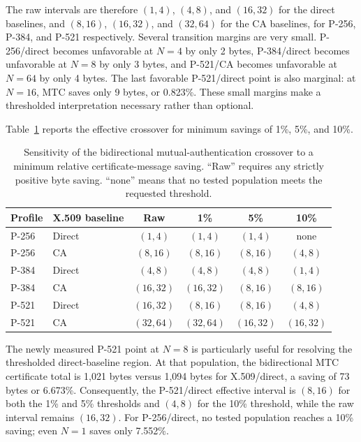 \documentclass[journal]{IEEEtran}
\begin{document}
The raw intervals are therefore $(1,4)$, $(4,8)$, and $(16,32)$ for the direct baselines, and $(8,16)$, $(16,32)$, and $(32,64)$ for the CA baselines, for P-256, P-384, and P-521 respectively. Several transition margins are very small. P-256/direct becomes unfavorable at $N=4$ by only 2 bytes, P-384/direct becomes unfavorable at $N=8$ by only 3 bytes, and P-521/CA becomes unfavorable at $N=64$ by only 4 bytes. The last favorable P-521/direct point is also marginal: at $N=16$, MTC saves only 9 bytes, or 0.823\%. These small margins make a thresholded interpretation necessary rather than optional.

Table~\ref{tab:mutual-auth-crossover-sensitivity} reports the effective crossover for minimum savings of 1\%, 5\%, and 10\%.

\begin{table}[t]
\caption{Sensitivity of the bidirectional mutual-authentication crossover to a minimum relative certificate-message saving. ``Raw'' requires any strictly positive byte saving. ``none'' means that no tested population meets the requested threshold.}
\label{tab:mutual-auth-crossover-sensitivity}
\centering
\begin{tabular}{llcccc}
\toprule
\textbf{Profile} & \textbf{X.509 baseline} & \textbf{Raw} & \textbf{1\%} & \textbf{5\%} & \textbf{10\%} \\
\midrule
P-256 & Direct & $(1,4)$   & $(1,4)$   & $(1,4)$   & none \\
P-256 & CA     & $(8,16)$  & $(8,16)$  & $(8,16)$  & $(4,8)$ \\
P-384 & Direct & $(4,8)$   & $(4,8)$   & $(4,8)$   & $(1,4)$ \\
P-384 & CA     & $(16,32)$ & $(16,32)$ & $(8,16)$  & $(8,16)$ \\
P-521 & Direct & $(16,32)$ & $(8,16)$  & $(8,16)$  & $(4,8)$ \\
P-521 & CA     & $(32,64)$ & $(32,64)$ & $(16,32)$ & $(16,32)$ \\
\bottomrule
\end{tabular}
\end{table}

The newly measured P-521 point at $N=8$ is particularly useful for resolving the thresholded direct-baseline region. At that population, the bidirectional MTC certificate total is 1,021 bytes versus 1,094 bytes for X.509/direct, a saving of 73 bytes or 6.673\%. Consequently, the P-521/direct effective interval is $(8,16)$ for both the 1\% and 5\% thresholds and $(4,8)$ for the 10\% threshold, while the raw interval remains $(16,32)$. For P-256/direct, no tested population reaches a 10\% saving; even $N=1$ saves only 7.552\%.
\end{document}
